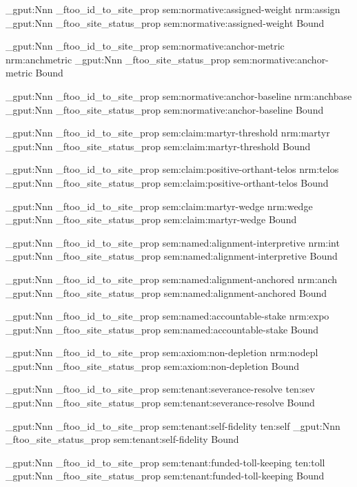 \prop_gput:Nnn \g_ftoo_id_to_site_prop { sem:normative:assigned-weight } { nrm:assign }
\prop_gput:Nnn \g_ftoo_site_status_prop { sem:normative:assigned-weight } { Bound }

\prop_gput:Nnn \g_ftoo_id_to_site_prop { sem:normative:anchor-metric } { nrm:anchmetric }
\prop_gput:Nnn \g_ftoo_site_status_prop { sem:normative:anchor-metric } { Bound }

\prop_gput:Nnn \g_ftoo_id_to_site_prop { sem:normative:anchor-baseline } { nrm:anchbase }
\prop_gput:Nnn \g_ftoo_site_status_prop { sem:normative:anchor-baseline } { Bound }

\prop_gput:Nnn \g_ftoo_id_to_site_prop { sem:claim:martyr-threshold } { nrm:martyr }
\prop_gput:Nnn \g_ftoo_site_status_prop { sem:claim:martyr-threshold } { Bound }

\prop_gput:Nnn \g_ftoo_id_to_site_prop { sem:claim:positive-orthant-telos } { nrm:telos }
\prop_gput:Nnn \g_ftoo_site_status_prop { sem:claim:positive-orthant-telos } { Bound }

\prop_gput:Nnn \g_ftoo_id_to_site_prop { sem:claim:martyr-wedge } { nrm:wedge }
\prop_gput:Nnn \g_ftoo_site_status_prop { sem:claim:martyr-wedge } { Bound }

\prop_gput:Nnn \g_ftoo_id_to_site_prop { sem:named:alignment-interpretive } { nrm:int }
\prop_gput:Nnn \g_ftoo_site_status_prop { sem:named:alignment-interpretive } { Bound }

\prop_gput:Nnn \g_ftoo_id_to_site_prop { sem:named:alignment-anchored } { nrm:anch }
\prop_gput:Nnn \g_ftoo_site_status_prop { sem:named:alignment-anchored } { Bound }

\prop_gput:Nnn \g_ftoo_id_to_site_prop { sem:named:accountable-stake } { nrm:expo }
\prop_gput:Nnn \g_ftoo_site_status_prop { sem:named:accountable-stake } { Bound }

\prop_gput:Nnn \g_ftoo_id_to_site_prop { sem:axiom:non-depletion } { nrm:nodepl }
\prop_gput:Nnn \g_ftoo_site_status_prop { sem:axiom:non-depletion } { Bound }

\prop_gput:Nnn \g_ftoo_id_to_site_prop { sem:tenant:severance-resolve } { ten:sev }
\prop_gput:Nnn \g_ftoo_site_status_prop { sem:tenant:severance-resolve } { Bound }

\prop_gput:Nnn \g_ftoo_id_to_site_prop { sem:tenant:self-fidelity } { ten:self }
\prop_gput:Nnn \g_ftoo_site_status_prop { sem:tenant:self-fidelity } { Bound }

\prop_gput:Nnn \g_ftoo_id_to_site_prop { sem:tenant:funded-toll-keeping } { ten:toll }
\prop_gput:Nnn \g_ftoo_site_status_prop { sem:tenant:funded-toll-keeping } { Bound }

